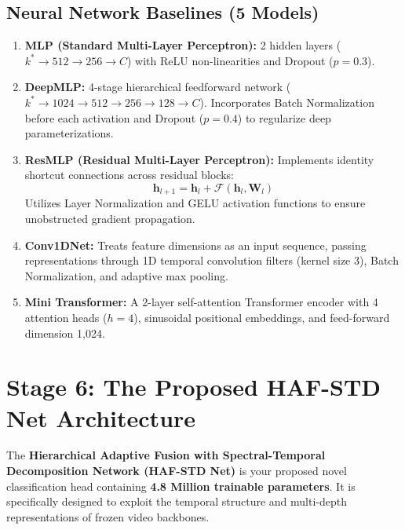 \documentclass[a4paper, 11pt]{article}
\begin{document}
\subsection{Neural Network Baselines (5 Models)}
\begin{enumerate}
    \item \textbf{MLP (Standard Multi-Layer Perceptron):} 2 hidden layers ($k^* \rightarrow 512 \rightarrow 256 \rightarrow C$) with ReLU non-linearities and Dropout ($p=0.3$).
    \item \textbf{DeepMLP:} 4-stage hierarchical feedforward network ($k^* \rightarrow 1024 \rightarrow 512 \rightarrow 256 \rightarrow 128 \rightarrow C$). Incorporates Batch Normalization before each activation and Dropout ($p=0.4$) to regularize deep parameterizations.
    \item \textbf{ResMLP (Residual Multi-Layer Perceptron):} Implements identity shortcut connections across residual blocks:
    \begin{equation}
        \mathbf{h}_{l+1} = \mathbf{h}_l + \mathcal{F}(\mathbf{h}_l, \mathbf{W}_l)
    \end{equation}
    Utilizes Layer Normalization and GELU activation functions to ensure unobstructed gradient propagation.
    \item \textbf{Conv1DNet:} Treats feature dimensions as an input sequence, passing representations through 1D temporal convolution filters (kernel size 3), Batch Normalization, and adaptive max pooling.
    \item \textbf{Mini Transformer:} A 2-layer self-attention Transformer encoder with 4 attention heads ($h=4$), sinusoidal positional embeddings, and feed-forward dimension 1,024.
\end{enumerate}

\section{Stage 6: The Proposed HAF-STD Net Architecture}

The \textbf{Hierarchical Adaptive Fusion with Spectral-Temporal Decomposition Network (HAF-STD Net)} is your proposed novel classification head containing \textbf{4.8 Million trainable parameters}. It is specifically designed to exploit the temporal structure and multi-depth representations of frozen video backbones.
\end{document}
